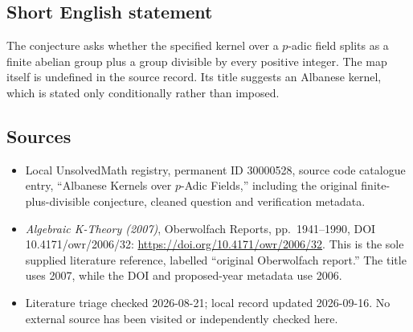\documentclass[11pt]{article}
\begin{document}
\subsection{Short English statement}
The conjecture asks whether the specified kernel over a \(p\)-adic field splits as a finite abelian group plus a group divisible by every positive integer. The map itself is undefined in the source record. Its title suggests an Albanese kernel, which is stated only conditionally rather than imposed.
\subsection{Sources}
\begin{itemize}
\item Local UnsolvedMath registry, permanent ID 30000528, source code catalogue entry, ``Albanese Kernels over \(p\)-Adic Fields,'' including the original finite-plus-divisible conjecture, cleaned question and verification metadata.
\item \emph{Algebraic K-Theory (2007)}, Oberwolfach Reports, pp.\ 1941--1990, DOI 10.4171/owr/2006/32: \url{https://doi.org/10.4171/owr/2006/32}. This is the sole supplied literature reference, labelled ``original Oberwolfach report.'' The title uses 2007, while the DOI and proposed-year metadata use 2006.
\item Literature triage checked 2026-08-21; local record updated 2026-09-16. No external source has been visited or independently checked here.
\end{itemize}
\end{document}
